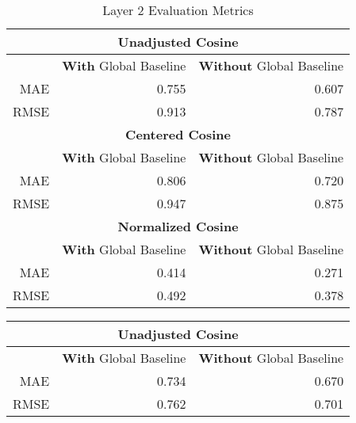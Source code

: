 \documentclass[twoside,11pt]{article}
\begin{document}
{\begin{table}[H]
	\begin{center}
		\begin{tabular}{ |r||r|r| }
			\hline

			\multicolumn{3}{|c|}{\textbf{Unadjusted Cosine}} \\
			\hline\hline
    		& \textbf{With} Global Baseline & \textbf{Without} Global Baseline  \\
    		\hline
			MAE & 0.755 & 0.607 \\
			\hline
			RMSE & 0.913 & 0.787 \\

            \hline
            \hline

			\multicolumn{3}{|c|}{\textbf{Centered Cosine}} \\
			\hline\hline
    		& \textbf{With} Global Baseline & \textbf{Without} Global Baseline  \\
    		\hline
			MAE & 0.806 & 0.720 \\
			\hline
			RMSE & 0.947 & 0.875 \\

			\hline
			\hline

			\multicolumn{3}{|c|}{\textbf{Normalized Cosine}} \\
			\hline\hline
    		& \textbf{With} Global Baseline & \textbf{Without} Global Baseline  \\
    		\hline
			MAE & 0.414 & 0.271 \\
			\hline
			RMSE & 0.492 & 0.378 \\
			\hline
		\end{tabular}
	\end{center}
	\caption{Layer 2 Evaluation Metrics }
	\label{table:evaluation-2}
\end{table}

\begin{table}[H]
	\begin{center}
		\begin{tabular}{ |r||r|r| }
			\hline

			\multicolumn{3}{|c|}{\textbf{Unadjusted Cosine}} \\
			\hline\hline
    		& \textbf{With} Global Baseline & \textbf{Without} Global Baseline  \\
    		\hline
			MAE & 0.734 & 0.670 \\
			\hline
			RMSE & 0.762 & 0.701 \\

            \hline
            \hline


\end{tabular}
\end{center}
\end{table}}
\end{document}
